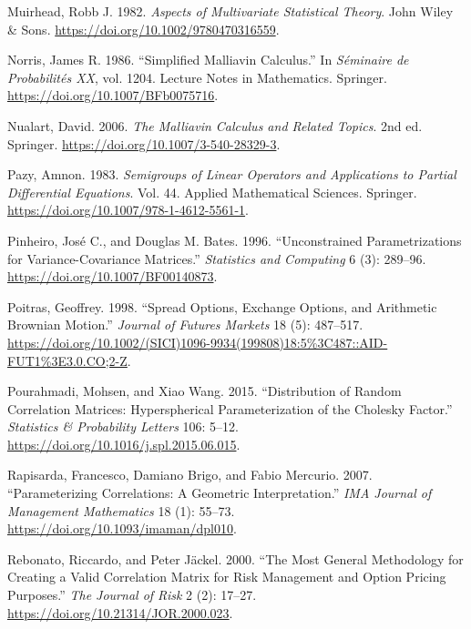 \documentclass[
  english,
  11pt,
  letterpaper,
  DIV=11,
  numbers=noendperiod]{scrartcl}
\newlength{\cslhangindent}
\newenvironment{CSLReferences}[2] %
 {\begin{list}{}{%
  \setlength{\itemindent}{0pt}
  \setlength{\leftmargin}{0pt}
  \setlength{\parsep}{0pt}
  \ifodd #1
   \setlength{\leftmargin}{\cslhangindent}
   \setlength{\itemindent}{-1\cslhangindent}
  \fi
  \setlength{\itemsep}{#2\baselineskip}}}
 {\end{list}}
\theoremstyle{plain}
\theoremstyle{plain}
\theoremstyle{plain}
\theoremstyle{plain}
\theoremstyle{remark}
\begin{document}
\begin{CSLReferences}{1}{1}
Muirhead, Robb J. 1982. \emph{Aspects of Multivariate Statistical
Theory}. John Wiley \& Sons.
\url{https://doi.org/10.1002/9780470316559}.

Norris, James R. 1986. {``Simplified Malliavin Calculus.''} In
\emph{S{é}minaire de Probabilit{é}s XX}, vol. 1204. Lecture Notes in
Mathematics. Springer. \url{https://doi.org/10.1007/BFb0075716}.

Nualart, David. 2006. \emph{The Malliavin Calculus and Related Topics}.
2nd ed. Springer. \url{https://doi.org/10.1007/3-540-28329-3}.

Pazy, Amnon. 1983. \emph{Semigroups of Linear Operators and Applications
to Partial Differential Equations}. Vol. 44. Applied Mathematical
Sciences. Springer. \url{https://doi.org/10.1007/978-1-4612-5561-1}.

Pinheiro, José C., and Douglas M. Bates. 1996. {``Unconstrained
Parametrizations for Variance-Covariance Matrices.''} \emph{Statistics
and Computing} 6 (3): 289--96. \url{https://doi.org/10.1007/BF00140873}.

Poitras, Geoffrey. 1998. {``Spread Options, Exchange Options, and
Arithmetic Brownian Motion.''} \emph{Journal of Futures Markets} 18 (5):
487--517.
\url{https://doi.org/10.1002/(SICI)1096-9934(199808)18:5\%3C487::AID-FUT1\%3E3.0.CO;2-Z}.

Pourahmadi, Mohsen, and Xiao Wang. 2015. {``Distribution of Random
Correlation Matrices: Hyperspherical Parameterization of the Cholesky
Factor.''} \emph{Statistics \& Probability Letters} 106: 5--12.
\url{https://doi.org/10.1016/j.spl.2015.06.015}.

Rapisarda, Francesco, Damiano Brigo, and Fabio Mercurio. 2007.
{``Parameterizing Correlations: A Geometric Interpretation.''} \emph{IMA
Journal of Management Mathematics} 18 (1): 55--73.
\url{https://doi.org/10.1093/imaman/dpl010}.

Rebonato, Riccardo, and Peter Jäckel. 2000. {``The Most General
Methodology for Creating a Valid Correlation Matrix for Risk Management
and Option Pricing Purposes.''} \emph{The Journal of Risk} 2 (2):
17--27. \url{https://doi.org/10.21314/JOR.2000.023}.


\end{CSLReferences}
\end{document}
